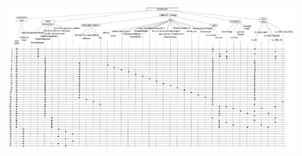 \documentclass[10pt]{article}
\newlength{\Li}\settowidth{\Li}{Case}
\newlength{\Lii}\setlength{\Lii}{7cm}
\newlength{\Liii}\setlength{\Liii}{\textwidth} \addtolength{\Liii}{-\Li} \addtolength{\Liii}{-\Lii}
\begin{document}
	\begin{figure}[htbp] %
   		\centering
		\includegraphics[width=1\textheight, angle=90]{graphics/OSEK_Internal_COM.pdf}
	\end{figure}

\setlength{\Lii}{10cm}
\setlength{\Liii}{\textwidth} \addtolength{\Liii}{-\Li} \addtolength{\Liii}{-\Lii}
\end{document}
